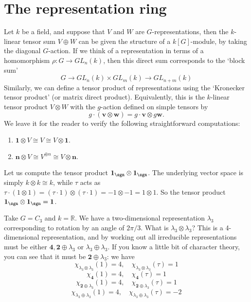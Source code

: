 \documentclass{willowtreebook}
\begin{document}
\section{The representation ring}
Let $k$ be a field, and suppose that $V$ and $W$ are $G$-representations, then the $k$-linear tensor sum $V \oplus W$ can be given the structure of a $k[G]$-module, by taking the diagonal $G$-action. If we think of a representation in terms of a homomorphism $\rho \colon G \to GL_n(k)$, then this direct sum corresponds to the `block sum'
\[
G \to GL_n(k) \times GL_m(k) \to GL_{n+m}(k)
\]
Similarly, we can define a tensor product of representations using the `Kronecker tensor product' (or matrix direct product). Equivalently, this is the $k$-linear tensor product $V \otimes W$ with the $g$-action defined on simple tensors by
\[
g \cdot (\mathbf{v} \otimes\mathbf{w}) = g \cdot \mathbf{v} \otimes g \mathbf{w}. 
\]
We leave it for the reader to verify the following straightforward computations:
\begin{enumerate}[label=(\alph*)]
    \item $\mathbf{1} \otimes V \cong V \cong V \otimes \mathbf{1}$. 
    \item $\mathbf{n} \otimes V \cong V^{\oplus n} \cong V \otimes \mathbf{n}$. 
\end{enumerate}
\begin{example}[label=ex:tensor-product-sign]
    Let us compute the tensor product $\mathbf{1}_{\sgn} \otimes \mathbf{1}_{\sgn}$. The underlying vector space is simply $k \otimes k \cong k$, while $\tau$ acts as $\tau \cdot (1 \otimes 1) = (\tau \cdot 1) \otimes (\tau \cdot 1) = -1 \otimes -1 = 1 \otimes 1$. So the tensor product $\mathbf{1}_{\sgn} \otimes \mathbf{1}_{\sgn} = \mathbf{1}$. 
   
\end{example}
\begin{example}[label=ex:tensor-product-c3]
    Take $G = C_3$ and $k = \mathbb{R}$. We have a two-dimensional representation $\lambda_3$ corresponding to rotation by an angle of $2\pi/3$. What is $\lambda_3 \otimes \lambda_3$? This is a 4-dimensional representation, and by working out all irreducible representations must be either $\mathbf{4}, \mathbf{2} \oplus \lambda_3$ or $\lambda_3 \oplus \lambda_3$. If you know a little bit of character theory, you can see that it must be $\mathbf{2} \oplus \lambda_3$: we have
    \[
\chi_{\lambda_3 \otimes \lambda_3}(1) = 4, \quad \chi_{\lambda_3 \otimes \lambda_3}(\tau) = 1
    \]
        \[
\chi_{\mathbf{4}}(1) = 4, \quad \chi_{\mathbf{4}}(\tau) = 1
    \]
        \[
\chi_{\mathbf{2} \oplus \lambda_3}(1) = 4, \quad \chi_{\mathbf{2} \oplus \lambda_3}(\tau) = 1
    \]
            \[
\chi_{\lambda_3 \oplus \lambda_3}(1) = 4, \quad \chi_{\lambda_3  \oplus \lambda_3}(\tau) = -2
    \]
\end{example}
\end{document}
